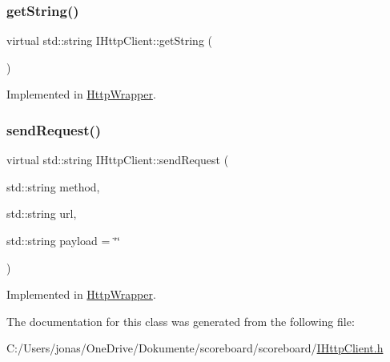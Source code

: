 \subsubsection{\texorpdfstring{get\+String()}{getString()}}
{\footnotesize\ttfamily virtual std\+::string I\+Http\+Client\+::get\+String (\begin{DoxyParamCaption}{ }\end{DoxyParamCaption})\hspace{0.3cm}{\ttfamily [pure virtual]}}



Implemented in \hyperlink{class_http_wrapper_a4c821b412205cfc46421b06e29a53f4f}{Http\+Wrapper}.

\mbox{\label{class_i_http_client_accb015ba9ef2b7963f13094297d97073}} 
\subsubsection{\texorpdfstring{send\+Request()}{sendRequest()}}
{\footnotesize\ttfamily virtual std\+::string I\+Http\+Client\+::send\+Request (\begin{DoxyParamCaption}\item[{std\+::string}]{method,  }\item[{std\+::string}]{url,  }\item[{std\+::string}]{payload = {\ttfamily \char`\"{}\char`\"{}} }\end{DoxyParamCaption})\hspace{0.3cm}{\ttfamily [pure virtual]}}



Implemented in \hyperlink{class_http_wrapper_ab80e5851ce58d7d820dba5f13bb14fa1}{Http\+Wrapper}.



The documentation for this class was generated from the following file\+:\begin{DoxyCompactItemize}
\item 
C\+:/\+Users/jonas/\+One\+Drive/\+Dokumente/scoreboard/scoreboard/\hyperlink{_i_http_client_8h}{I\+Http\+Client.\+h}\end{DoxyCompactItemize}
